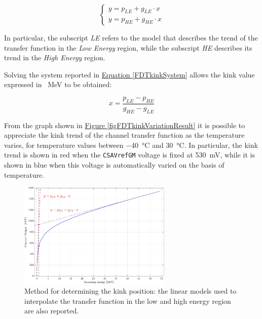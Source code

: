 \begin{equation}
    \begin{cases}
        y = p_{LE} + g_{LE} \cdot x \\
        y = p_{HE} + g_{HE} \cdot x
    \end{cases}
    \label{FDTkinkSystem}
\end{equation}

\noindent
In particular, the subscript \textit{LE} refers to the model that describes the trend of the transfer function in the \textit{Low Energy} region, while the subscript \textit{HE} describes its trend in the \textit{High Energy} region. 

\par
Solving the system reported in \hyperref[FDTkinkSystem]{Equation \ref{FDTkinkSystem}} allows the kink value expressed in \SI{}{\mega\electronvolt} to be obtained:

\begin{equation}
    x = \frac{p_{LE} - p_{HE}}{g_{HE} - g_{LE}}
\end{equation}

\par
From the graph shown in \hyperref[figFDTkinkVariationResult]{Figure \ref{figFDTkinkVariationResult}} it is possible to appreciate the kink trend of the channel transfer function as the temperature varies, for temperature values between \SI{-40}{\celsius} and \SI{30}{\celsius}. In particular, the kink trend is shown in red when the \texttt{CSAVrefGM} voltage is fixed at \SI{530}{\milli\volt}, while it is shown in blue when this voltage is automatically varied on the basis of temperature.

\begin{figure}[h!]
    \centering
    \includegraphics[width=0.65\textwidth]{Images/chap1/results/FDT/fdt_calcolo_kink.pdf}
    \caption{Method for determining the kink position: the linear models used to interpolate the transfer function in the low and high energy region are also reported.}
    \label{figFDTkinkVariation}
\end{figure}


